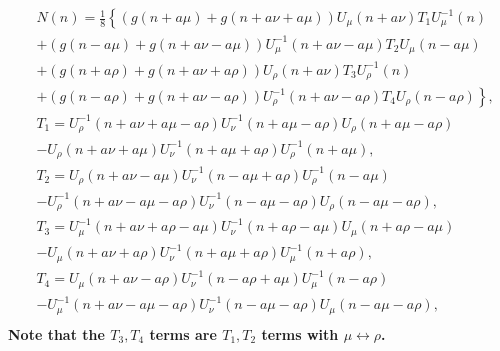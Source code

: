 \begin{equation}
\begin{split}
&N(n)=\frac{1}{8}\left\{(g(n+a\mu)+g(n+a\nu+a\mu))U_{\mu}(n+a\nu)T_1U_{\mu}^{-1}(n)\right.\\
&\left.+(g(n-a\mu)+g(n+a\nu-a\mu))U_{\mu}^{-1}(n+a\nu-a\mu)T_2U_{\mu}(n-a\mu)\right.\\
&\left.+(g(n+a\rho)+g(n+a\nu+a\rho))U_{\rho}(n+a\nu)T_3U_{\rho}^{-1}(n)\right.\\
&\left.+(g(n-a\rho)+g(n+a\nu-a\rho))U_{\rho}^{-1}(n+a\nu-a\rho)T_4U_{\rho}(n-a\rho)\right\},\\
&T_1=U_{\rho}^{-1}(n+a\nu+a\mu-a\rho)U_{\nu}^{-1}(n+a\mu-a\rho)U_{\rho}(n+a\mu-a\rho)\\
&-U_{\rho}(n+a\nu+a\mu)U_{\nu}^{-1}(n+a\mu+a\rho)U_{\rho}^{-1}(n+a\mu),\\
&T_2=U_{\rho}(n+a\nu-a\mu)U_{\nu}^{-1}(n-a\mu+a\rho)U_{\rho}^{-1}(n-a\mu)\\
&-U_{\rho}^{-1}(n+a\nu-a\mu-a\rho)U_{\nu}^{-1}(n-a\mu-a\rho)U_{\rho}(n-a\mu-a\rho),\\
&T_3=U_{\mu}^{-1}(n+a\nu+a\rho-a\mu)U_{\nu}^{-1}(n+a\rho-a\mu)U_{\mu}(n+a\rho-a\mu)\\
&-U_{\mu}(n+a\nu+a\rho)U_{\nu}^{-1}(n+a\mu+a\rho)U_{\mu}^{-1}(n+a\rho),\\
&T_4=U_{\mu}(n+a\nu-a\rho)U_{\nu}^{-1}(n-a\rho+a\mu)U_{\mu}^{-1}(n-a\rho)\\
&-U_{\mu}^{-1}(n+a\nu-a\mu-a\rho)U_{\nu}^{-1}(n-a\mu-a\rho)U_{\mu}(n-a\mu-a\rho),\\
\end{split}
\end{equation}
\textbf{Note that the $T_3,T_4$ terms are $T_1,T_2$ terms with $\mu \leftrightarrow \rho$.}

